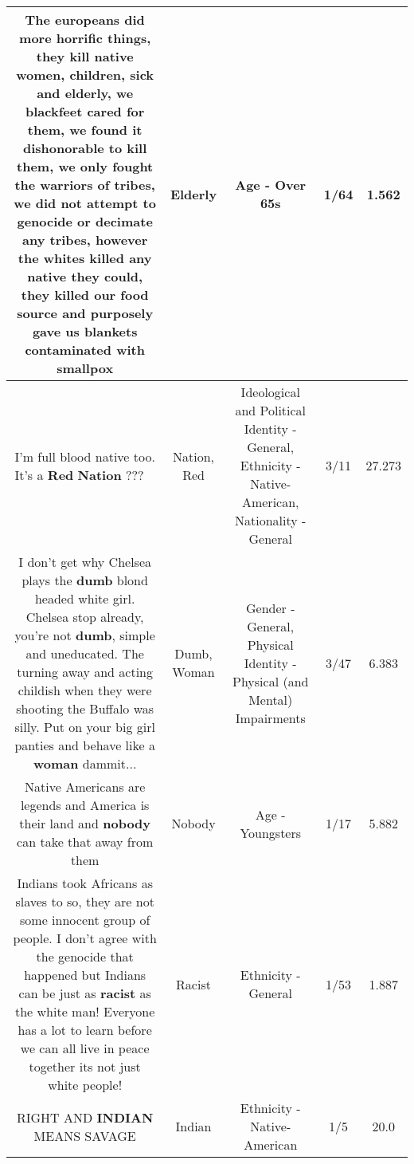 \documentclass[11pt]{article}
\newlength\mylength
\begin{document}
\begin{center}
\begin{longtable}{|C{.65\mylength}|C{.30\mylength}|C{.12\mylength}|C{.12\mylength}|C{.12\mylength}|}
  \small The europeans did more horrific things, they kill native women, children, sick and \textbf{elderly}, we blackfeet cared for them, we found it dishonorable to kill them, we only fought the warriors of tribes, we did not attempt to genocide or decimate any tribes, however the whites killed any native they could, they killed our food source and purposely gave us blankets contaminated with smallpox\normalsize   & Elderly & Age - Over 65s & 1/64 & 1.562 \\  \hline
  \small I'm full blood native too. It's a \textbf{R\textbf{ed}} \textbf{Nation} ??? ✊🏾\normalsize   & Nation, Red &  Ideological and Political Identity - General, Ethnicity - Native-American, Nationality - General & 3/11 & 27.273 \\  \hline
  \small I don't get why Chelsea plays the \textbf{dumb} blond headed white girl.  Chelsea stop already, you're not \textbf{dumb}, simple and uneducated.  The turning away and acting childish when they were shooting the Buffalo was silly.  Put on your big girl panties and behave like a \textbf{woman} dammit...\normalsize   & Dumb, Woman & Gender - General, Physical Identity - Physical (and Mental) Impairments & 3/47 & 6.383 \\  \hline
  \small Native Americans are legends and America is their land and \textbf{nobody} can take that away from them\normalsize   & Nobody & Age - Youngsters & 1/17 & 5.882 \\  \hline
  \small Indians took Africans as slaves to so, they are not some innocent group of people.  I don't agree with the genocide that happened but Indians can be just as \textbf{racist} as the white man!  Everyone has a lot to learn before we can all live in peace together its not just white people!\normalsize   & Racist & Ethnicity - General & 1/53 & 1.887 \\  \hline
  \small RIGHT AND \textbf{INDIAN} MEANS SAVAGE\normalsize   & Indian & Ethnicity - Native-American & 1/5 & 20.0 \\  \hline

\end{longtable}
\end{center}
\end{document}
